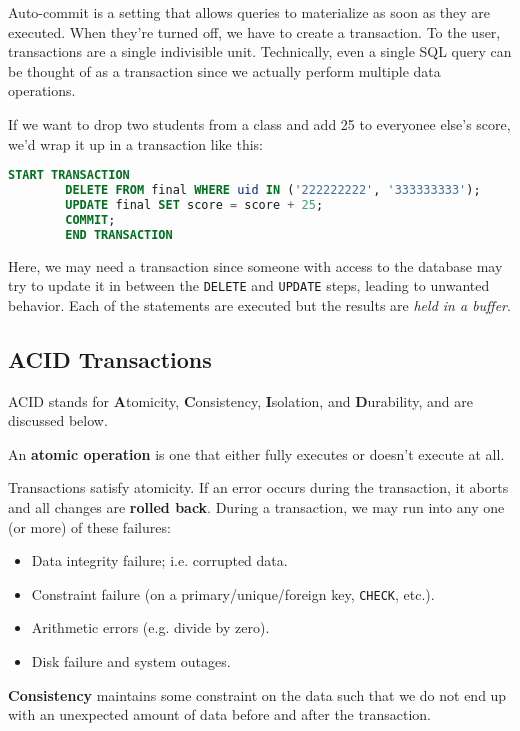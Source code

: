 \documentclass{report}
\newenvironment{definition}[1]{\begin{tcolorbox}[title={Definition: #1}]}{\end{tcolorbox}}
\newenvironment{example}{\begin{tcolorbox}[title={Example},colback=green!5!white,colframe=black!75!green]}{\end{tcolorbox}}
\renewcommand{\bf}[1]{\textbf{{#1}}}
\renewcommand{\tt}[1]{\texttt{{#1}}}
\renewcommand{\it}[1]{\textit{{#1}}}
\begin{document}
Auto-commit is a setting that allows queries to materialize as soon as they are
executed. When they're turned off, we have to create a transaction. To the user,
transactions are a single indivisible unit. Technically, even a single SQL query
can be thought of as a transaction since we actually perform multiple data
operations.
\begin{example}
    If we want to drop two students from a class and add 25 to everyonee else's
    score, we'd wrap it up in a transaction like this:
    \begin{lstlisting}[language=SQL, style=colorEX]
        START TRANSACTION
        DELETE FROM final WHERE uid IN ('222222222', '333333333');
        UPDATE final SET score = score + 25;
        COMMIT;
        END TRANSACTION
    \end{lstlisting}

    Here, we may need a transaction since someone with access to the database
    may try to update it in between the \tt{DELETE} and \tt{UPDATE} steps,
    leading to unwanted behavior. Each of the statements are executed but the
    results are \it{held in a buffer}.
\end{example}

\subsection{ACID Transactions}
ACID stands for \bf{A}tomicity, \bf{C}onsistency, \bf{I}solation, and
\bf{D}urability, and are discussed below.
\begin{definition}{Atomic Operation}
    An \bf{atomic operation} is one that either fully executes or doesn't
    execute at all.
\end{definition}

Transactions satisfy atomicity. If an error occurs during the transaction, it
aborts and all changes are \bf{rolled back}. During a transaction, we may run
into any one (or more) of these failures:
\begin{itemize}[label=$\to$]
    \item Data integrity failure; i.e. corrupted data.
    \item Constraint failure (on a primary/unique/foreign key, \tt{CHECK},
        etc.).
    \item Arithmetic errors (e.g. divide by zero).
    \item Disk failure and system outages.
\end{itemize}

\begin{definition}{Consistency}
    \bf{Consistency} maintains some constraint on the data such that we do not
    end up with an unexpected amount of data before and after the transaction.
\end{definition}
\end{document}
